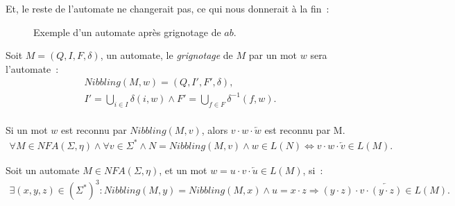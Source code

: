 Et, le reste de l'automate ne changerait pas, ce qui nous donnerait à la fin~:
\begin{figure}[H]
  \centering
  \captionsetup{type=figure,justification=centering}
  \caption{Exemple d'un automate après grignotage de \(ab\).}
\end{figure}

\begin{definition}
  Soit \(M = (Q, I, F, \delta)\), un automate, le \emph{grignotage} de \(M\)
  par un mot \(w\) sera l'automate~:
  \begin{gather*}
    Nibbling(M, w) = (Q, I', F', \delta), \\
    I' = \bigcup_{i \in I} \delta(i, w) \land F' = \bigcup_{f \in F}
    \delta^{-1}(f, w). \\
  \end{gather*}
\end{definition}

\begin{lemma}\label{lemma:grignotage}
  Si un mot \(w\) est reconnu par \(Nibbling(M, v)\), alors \(v \cdot w \cdot
  \overleftarrow{w}\) est reconnu par M.
  \begin{align*}
    \forall M \in NFA(\Sigma, \eta) \land \forall v \in \Sigma^* 
    \land N = Nibbling(M, v) \land w \in L(N) \Longleftrightarrow v \cdot w
    \cdot \overleftarrow{v} \in L(M).
  \end{align*}
\end{lemma}

\begin{lemma}\label{lemma:grignotage2}
  Soit un automate \(M \in NFA(\Sigma, \eta)\), et un mot \(w = u \cdot v
  \cdot \overleftarrow{u} \in L(M)\), si~:
  \begin{align*}
  \exists (x, y, z) \in (\Sigma^*)^3 \colon Nibbling(M, y) = Nibbling(M, x)
  \land u = x \cdot z \Longrightarrow (y \cdot z) \cdot v \cdot
  \overleftarrow{(y \cdot z)} \in L(M).
  \end{align*}
\end{lemma}

